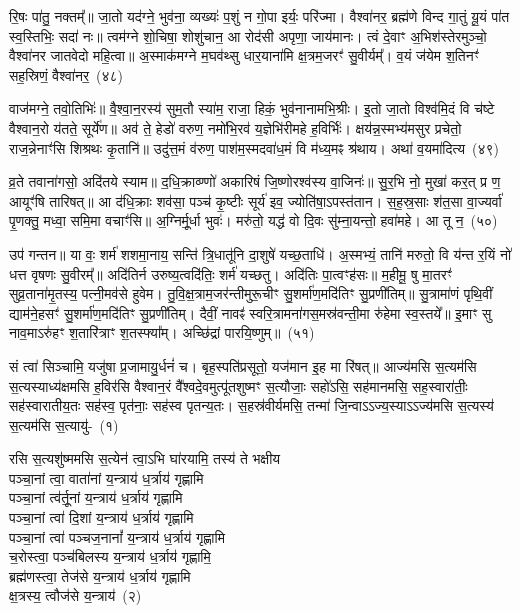 रि॒षः पा॑तु॒ नक्तम्᳚॥ जा॒तो यद॑ग्ने॒ भुव॑ना॒ व्यख्यः॑ प॒शुं न गो॒पा इर्यः॒ परि॑ज्मा। वैश्वा॑नर॒ ब्रह्म॑णे विन्द गा॒तुं यू॒यं पा॑त स्व॒स्तिभिः॒ सदा॑ नः॥ त्वम॑ग्ने शो॒चिषा॒ शोशु॑चान॒ आ रोद॑सी अपृणा॒ जाय॑मानः। त्वं दे॒वाꣳ अ॒भिश॑स्तेरमुञ्चो॒ वैश्वा॑नर जातवेदो महि॒त्वा॥ अ॒स्माक॑मग्ने म॒घव॑थ्सु धार॒याना॑मि क्ष॒त्रम॒जरꣳ॑ सु॒वीर्यम्᳚। व॒यं ज॑येम श॒तिनꣳ॑ सह॒स्रिणं॒ वैश्वा॑नर॒~(४८)

वाज॑मग्ने॒ तवो॒तिभिः॑॥ वै॒श्वा॒न॒रस्य॑ सुम॒तौ स्या॑म॒ राजा॒ हिकं॒ भुव॑नानामभि॒श्रीः। इ॒तो जा॒तो विश्व॑मि॒दं वि च॑ष्टे वैश्वान॒रो य॑तते॒ सूर्ये॑ण॥ अव॑ ते॒ हेडो॑ वरुण॒ नमो॑\-भि॒रव॑ य॒ज्ञेभि॑रीमहे ह॒विर्भिः॑। क्षय॑न्न॒स्मभ्य॑मसुर प्रचेतो॒ राज॒न्नेनाꣳ॑सि शिश्रथः कृ॒तानि॑॥ उदु॑त्त॒मं व॑रुण॒ पाश॑\-म॒स्मद\-वा॑ध॒मं वि म॑ध्य॒मꣴ श्र॑थाय। अथा॑ व॒यमा॑दित्य~(४९)

व्र॒ते तवाना॑गसो॒ अदि॑तये स्याम॥ द॒धि॒क्राव्ण्णो॑ अकारिषं जि॒ष्णोरश्व॑स्य वा॒जिनः॑॥ सु॒र॒भि नो॒ मुखा॑ कर॒त् प्र ण॒ आयूꣳ॑षि तारिषत्॥ आ द॑धि॒क्राः शव॑सा॒ पञ्च॑ कृ॒ष्टीः सूर्य॑ इव॒ ज्योति॑षा॒\-ऽपस्त॑तान। स॒ह॒स्र॒साः श॑त॒सा वा॒ज्यर्वा॑ पृ॒णक्तु॒ मध्वा॒ समि॒मा वचाꣳ॑सि॥ अ॒ग्निर्मू॒र्धा भुवः॑। मरु॑तो॒ यद्ध॑ वो दि॒वः सु॑म्ना॒यन्तो॒ हवा॑महे। आ तू न॒~(५०)

उप॑ गन्तन॥ या वः॒ शर्म॑ शशमा॒नाय॒ सन्ति॑ त्रि॒धातू॑नि दा॒शुषे॑ यच्छ॒ताधि॑। अ॒स्मभ्यं॒ तानि॑ मरुतो॒ वि य॑न्त र॒यिं नो॑ धत्त वृषणः सु॒वीरम्᳚॥ अदि॑तिर्न उरुष्य॒त्वदि॑तिः॒ शर्म॑ यच्छतु। अदि॑तिः पा॒त्वꣳह॑सः॥ म॒हीमू॒ षु मा॒तरꣳ॑ सुव्र॒ता\-ना॑\-मृ॒तस्य॒ पत्नी॒मव॑से हुवेम। तु॒वि॒क्ष॒त्रा\-म॒जर॑न्ती\-मुरू॒चीꣳ सु॒शर्मा॑ण॒मदि॑तिꣳ सु॒प्रणी॑तिम्॥ सु॒त्रामा॑णं पृथि॒वीं द्याम॑ने॒हसꣳ॑ सु॒शर्मा॑ण॒मदि॑तिꣳ सु॒प्रणी॑तिम्। दैवीं॒ नावꣴ॑ स्वरि॒त्रा\-मना॑\-गस॒मस्र॑वन्ती॒मा रु॑हेमा स्व॒स्तये᳚॥ इ॒माꣳ सु नाव॒मा\-ऽरु॑हꣳ श॒तारि॑त्राꣳ श॒तस्फ्या᳚म्। अच्छि॑द्रां पारयि॒ष्णुम्॥~(५१)

{\anuvakamend[{दिवा॒ स स॑ह॒स्रिणं॒ वैश्वा॑नरा\-ऽ\-ऽदित्य॒ तू नो॑\-ऽने॒हसꣳ॑ सु॒शर्मा॑ण॒मेका॒न्न\-विꣳ॑श॒तिश्च॑}]}%

\setcounter{anuvakam}{0}
सं त्वा॑ सिञ्चामि॒ यजु॑षा प्र॒जामायु॒र्धनं॑ च। बृह॒स्पति॑प्रसूतो॒ यज॑मान इ॒ह मा रि॑षत्॥ आज्य॑मसि स॒त्यम॑सि स॒त्यस्याध्य॑क्षमसि ह॒विर॑सि वैश्वान॒रं वै᳚श्वदे॒वमुत्पू॑तशुष्मꣳ स॒त्यौजाः॒ सहो॑\-ऽसि॒ सह॑मानमसि॒ सह॒स्वारा॑तीः॒ सह॑स्वारातीय॒तः सह॑स्व॒ पृत॑नाः॒ सह॑स्व पृतन्य॒तः। स॒हस्र॑वीर्यमसि॒ तन्मा॑ जि॒न्वा\-ऽ\-ऽज्य॒स्या\-ऽ\-ऽज्य॑मसि स॒त्यस्य॑ स॒त्यम॑सि स॒त्यायु॑-~(१)

रसि स॒त्यशु॑ष्ममसि स॒त्येन॑ त्वा॒\-ऽभि घा॑रयामि॒ तस्य॑ ते भक्षीय\\
पञ्चा॒नां त्वा॒ वाता॑नां य॒न्त्राय॑ ध॒र्त्राय॑ गृह्णामि\\
पञ्चा॒नां त्व॑र्तू॒नां य॒न्त्राय॑ ध॒र्त्राय॑ गृह्णामि\\
पञ्चा॒नां त्वा॑ दि॒शां य॒न्त्राय॑ ध॒र्त्राय॑ गृह्णामि\\
पञ्चा॒नां त्वा॑ पञ्चज॒नानां᳚ य॒न्त्राय॑ ध॒र्त्राय॑ गृह्णामि\\
च॒रोस्त्वा॒ पञ्च॑बिलस्य य॒न्त्राय॑ ध॒र्त्राय॑ गृह्णामि॒\\
ब्रह्म॑णस्त्वा॒ तेज॑से य॒न्त्राय॑ ध॒र्त्राय॑ गृह्णामि\\
क्ष॒त्रस्य॒ त्वौज॑से य॒न्त्राय॑~(२)

